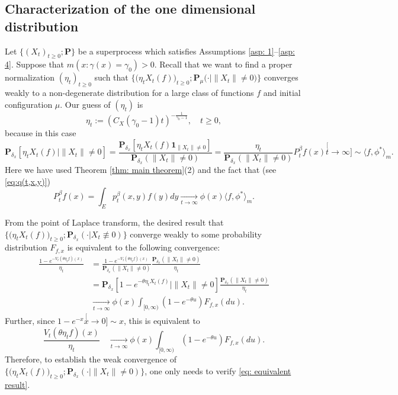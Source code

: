 \documentclass[12pt, a4paper]{amsart}
\theoremstyle{definition}
\numberwithin{equation}{section}
\begin{document}
\subsection{Characterization of the one dimensional distribution}
\label{sec: conditional distribution}
	Let $\{(X_t)_{t\geq 0}; \mathbf P\}$
    be a superprocess which satisfies
	Assumptions \ref{asp: 1}--\ref{asp: 4}.
	Suppose that $m(x: \gamma(x) = \gamma_0)>0$.
	Recall that we want to find a proper normalization $(\eta_t)_{t\geq 0}$ such that $\big\{\big(\eta_t X_t(f))_{t \geq 0}; \mathbf P_\mu(\cdot | \|X_t\| \neq 0\big)\big\}$
	converges weakly
	to a non-degenerate distribution for a large class of functions $f$ and initial configuration $\mu$.
	Our guess of $(\eta_t)$ is
\[\label{eq: definition of eta}
	\eta_t
	:= (C_X(\gamma_0 - 1) t)^{-\frac{1}{\gamma_0 - 1}},
	\quad t\geq 0,
\]
	because in this case
 \[
 	\mathbf P_{\delta_x}[\eta_t X_t(f)|\|X_t\|\neq 0]
	= \frac{\mathbf P_{\delta_x}[\eta_t X_t(f) \mathbf 1_{\|X_t\|\neq 0}]} {\mathbf P_{\delta_x}(\|X_t\|\neq 0) }
	= \frac{\eta_t}{\mathbf P_{\delta_x}(\|X_t\|\neq 0)} P^\beta_t f(x)
	\stackrel[t\to \infty]{}{\sim}  \langle f,\phi^* \rangle_m.
 \]
 	Here we have used Theorem \ref{thm: main theorem}(2) and the fact that (see \eqref{eq:q(t,x,y)})
 \[
 	P^\beta_t f(x)
 	= \int_E p_t^\beta(x,y)f(y)dy
 	\xrightarrow[t\to \infty]{}  \phi(x) \langle f,\phi^*\rangle_m.
 \]
 	
From the point of Laplace transform,
 the desired result that $\big\{\big(\eta_t X_t(f)\big)_{t \geq 0}; \mathbf P_{\delta_x}(\cdot | X_t \not \equiv 0)\big\}$
 converge weakly
 	to some probability distribution $F_{f,x}$ is equivalent to the following convergence:
\[\begin{split}
 	\frac{1-e^{- V_t(\theta \eta_t f)(x)}}{\eta_t}
	&= \frac{1-e^{- V_t(\theta \eta_t f)(x)}}{\mathbf P_{\delta_x}(\|X_t\|\neq 0)} \frac{ \mathbf P_{\delta_x}(\|X_t\|\neq 0) } { \eta_t }\\
	&= \mathbf P_{\delta_x}[1-e^{-\theta \eta_t X_t(f)}|\|X_t\|\neq 0]  \frac{ \mathbf P_{\delta_x}(\|X_t\|\neq 0) } { \eta_t }
	\\& \xrightarrow[t\to \infty]{} \phi(x) \int_{[0,\infty)}(1-e^{-\theta u})F_{f,x}(du).
\end{split}\]
	Further, since $1-e^{-x} \stackrel[x\to 0]{}{\sim} x$, this is equivalent to
\[\label{eq: equivalent result}
	\frac{V_t(\theta \eta_t f)(x)}{\eta_t}
	\quad \xrightarrow[t\to \infty]{} \phi(x) \int_{[0,\infty)}(1-e^{-\theta u})F_{f,x}(du).
\]
	Therefore, to
	establish the weak convergence of $\big\{\big(\eta_t X_t(f)\big)_{t \geq 0}; \mathbf P_{\delta_x}(\cdot | \|X_t\|\neq 0)\big\}$, one only needs to verify \eqref{eq: equivalent result}.
	
\end{document}
